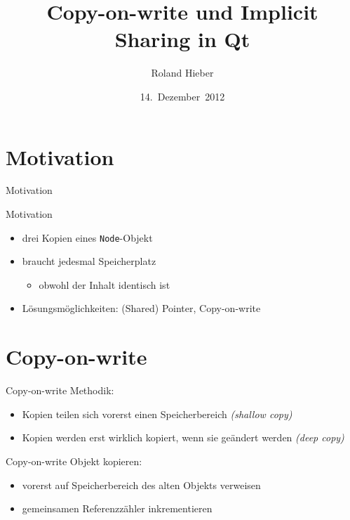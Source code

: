 \documentclass{beamer}
\author{Roland Hieber}
\title{Copy-on-write und Implicit Sharing in Qt}
\institute{Stratum~0~e.~V.}
\date{14.~Dezember~2012}
\begin{document}
\begin{frame}
  \titlepage
  \thispagestyle{empty}
\end{frame}

\section{Motivation}
\begin{frame}{Motivation}
  
\end{frame}
\begin{frame}{Motivation}
  
  \begin{itemize}
    \item drei Kopien eines \texttt{Node}-Objekt
    \item braucht jedesmal Speicherplatz
    \begin{itemize}
      \item obwohl der Inhalt identisch ist
    \end{itemize}
    \item Lösungsmöglichkeiten: (Shared) Pointer, Copy-on-write
  \end{itemize}
\end{frame}

\section{Copy-on-write}
\begin{frame}{Copy-on-write}
  Methodik:
  \begin{itemize}
    \item Kopien teilen sich vorerst einen Speicherbereich 
      \emph{(shallow copy)}
    \item Kopien werden erst wirklich kopiert, wenn sie geändert werden
      \emph{(deep copy)}
  \end{itemize}
\end{frame}

\begin{frame}{Copy-on-write}
  Objekt kopieren:
    \begin{itemize}
      \item vorerst auf Speicherbereich des alten Objekts verweisen
      \item gemeinsamen Referenzzähler inkrementieren
    \end{itemize}
\end{frame}
\end{document}
